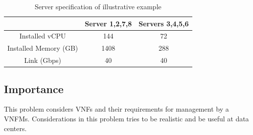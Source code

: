 \begin{table}
    \centering
    \caption{Server specification of illustrative example}
    \begin{tabular}{|c|c|c|}
        \hline
        & Server 1,2,7,8 & Servers 3,4,5,6 \\
        \hline
        Installed vCPU & 144 & 72 \\
        \hline
        Installed Memory (GB) & 1408 & 288 \\
        \hline
        Link (Gbps) & 40 & 40 \\
        \hline
    \end{tabular}
    \label{tbl:example-server-spec}
\end{table}

\subsection{Importance}
\par
This problem considers VNFs and their requirements for management by a VNFMs. Considerations in this problem tries to be realistic and be useful at data centers.